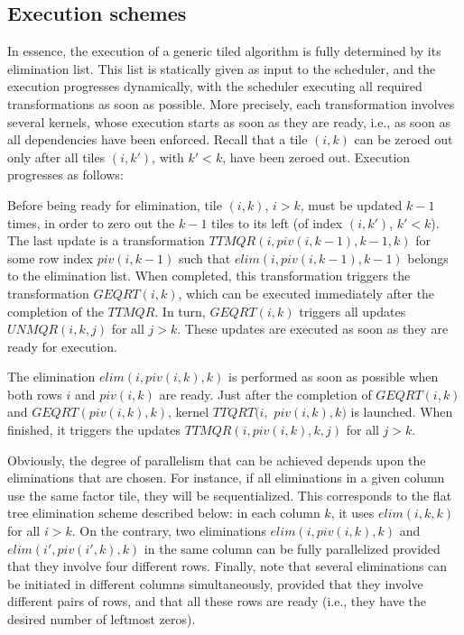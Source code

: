 \documentclass[a4paper,twopages]{article}
\newcommand{\elim}{\mathit{elim}}
\newcommand{\GEQRT}{\ensuremath{\mathit{GEQRT}}\xspace}
\newcommand{\UNMQR}{\ensuremath{\mathit{UNMQR}}\xspace}
\newcommand{\TTQRT}{\ensuremath{\mathit{TTQRT}}\xspace}
\newcommand{\TTMQR}{\ensuremath{\mathit{TTMQR}}\xspace}
\begin{document}
\subsection{Execution schemes}

In essence, the execution of a generic tiled algorithm is fully determined by
its elimination list.  This list is statically given as input to the scheduler,
and the execution progresses dynamically, with the scheduler executing all
required transformations as soon as possible.  More precisely, each
transformation involves several kernels, whose execution starts as soon as they
are ready, i.e., as soon as all dependencies have been enforced.
Recall that a tile $(i,k)$ can be zeroed out only after all tiles $(i,k')$, with
$k' < k$, have been zeroed out. Execution progresses as follows:
\begin{compactitem}
\item Before being ready for elimination, tile $(i,k)$, $i>k$, must be updated
    $k-1$ times, in order to zero out the $k-1$ tiles to its left (of index
    $(i,k')$, $k' < k$). The last update is a transformation $\TTMQR(i, piv(i,k-1),
    k-1, k)$ for some row index $piv(i,k-1)$ such that $\elim(i, piv(i,k-1), k-1)$
    belongs to the elimination list. When completed, this transformation
    triggers the transformation $\GEQRT(i,k)$, which can be executed
    immediately after the completion of the \TTMQR. In turn, $\GEQRT(i,k)$
    triggers all updates $\UNMQR(i, k, j)$ for all $j > k$.  These updates
    are executed as soon as they are ready for execution.

\item The elimination $\elim(i, piv(i,k), k)$ is performed as soon as possible
    when both rows $i$ and $piv(i,k)$ are ready. Just after the completion of \linebreak
    $\GEQRT(i, k)$ and $\GEQRT(piv(i,k), k)$, kernel
    $\TTQRT(i,$ $piv(i,k), k)$ is launched. When finished, it
    triggers the updates $\TTMQR(i,piv(i,k), k, j)$ for all $j > k$.
\end{compactitem}

Obviously, the degree of parallelism that can be achieved depends upon the
eliminations that are chosen.  For instance, if all eliminations in a given
column use the same factor tile, they will be sequentialized.  This corresponds
to the flat tree elimination scheme described below: in each column $k$, it
uses $\elim(i, k, k)$ for all $i>k$. On the contrary, two eliminations
$\elim(i, piv(i,k), k)$  and $\elim(i', piv(i',k), k)$ in the same column can
be fully parallelized provided that they involve four different rows. Finally,
note that several eliminations can be initiated in different columns
simultaneously, provided that they involve different pairs of rows, and that
all these rows are ready (i.e., they have the desired number of leftmost
zeros).
\end{document}
